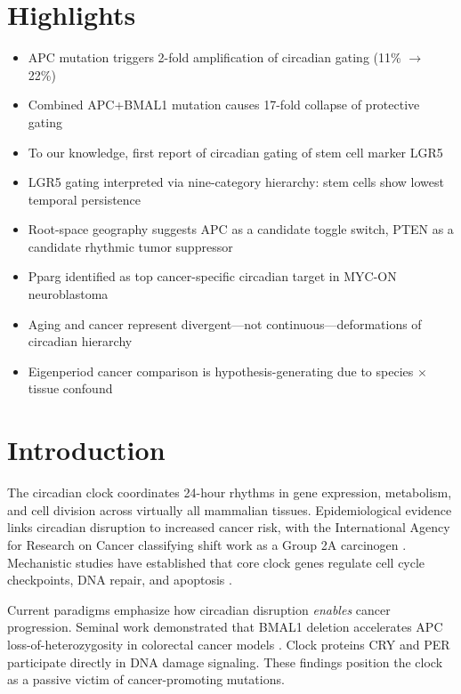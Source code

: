 \documentclass[11pt,letterpaper]{article}
\begin{document}
\section*{Highlights}
\begin{itemize}[noitemsep]
    \item APC mutation triggers 2-fold amplification of circadian gating (11\% $\rightarrow$ 22\%)
    \item Combined APC+BMAL1 mutation causes 17-fold collapse of protective gating
    \item To our knowledge, first report of circadian gating of stem cell marker LGR5
    \item LGR5 gating interpreted via nine-category hierarchy: stem cells show lowest temporal persistence
    \item Root-space geography suggests APC as a candidate toggle switch, PTEN as a candidate rhythmic tumor suppressor
    \item Pparg identified as top cancer-specific circadian target in MYC-ON neuroblastoma
    \item Aging and cancer represent divergent---not continuous---deformations of circadian hierarchy
    \item Eigenperiod cancer comparison is hypothesis-generating due to species $\times$ tissue confound
\end{itemize}

\section{Introduction}

The circadian clock coordinates 24-hour rhythms in gene expression, metabolism, and cell division across virtually all mammalian tissues. Epidemiological evidence links circadian disruption to increased cancer risk, with the International Agency for Research on Cancer classifying shift work as a Group 2A carcinogen \citep{straif2007}. Mechanistic studies have established that core clock genes regulate cell cycle checkpoints, DNA repair, and apoptosis \citep{takahashi2017, fu2002}.

Current paradigms emphasize how circadian disruption \textit{enables} cancer progression. Seminal work demonstrated that BMAL1 deletion accelerates APC loss-of-heterozygosity in colorectal cancer models \citep{chun2022}. Clock proteins CRY and PER participate directly in DNA damage signaling. These findings position the clock as a passive victim of cancer-promoting mutations.
\end{document}
